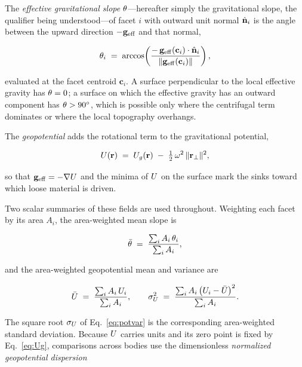 The \emph{effective gravitational slope} $\theta$---hereafter simply the
gravitational slope, the qualifier being understood---of facet $i$ with outward
unit normal $\hat{\mathbf{n}}_{i}$ is the angle between the upward direction $-\mathbf{g}_{\mathrm{eff}}$ and
that normal,

\begin{equation}
\theta_{i} \;=\; \arccos\!\left(
\frac{-\,\mathbf{g}_{\mathrm{eff}}(\mathbf{c}_{i})\cdot\hat{\mathbf{n}}_{i}}
     {\lVert \mathbf{g}_{\mathrm{eff}}(\mathbf{c}_{i}) \rVert} \right),
\label{eq:slope}
\end{equation}

evaluated at the facet centroid $\mathbf{c}_{i}$. A surface perpendicular to
the local effective gravity has $\theta=0$; a surface on which the effective
gravity has an outward component has $\theta>90^{\circ}$, which is possible
only where the centrifugal term dominates or where the local topography
overhangs.

The \emph{geopotential} adds the rotational term to the gravitational
potential,

\begin{equation}
U(\mathbf{r}) \;=\; U_{g}(\mathbf{r})
\;-\;\tfrac{1}{2}\,\omega^{2}\,\lVert\mathbf{r}_{\perp}\rVert^{2},
\label{eq:geopot}
\end{equation}

so that $\mathbf{g}_{\mathrm{eff}}=-\nabla U$ and the minima of $U$ on the surface mark the
sinks toward which loose material is driven.

Two scalar summaries of these fields are used throughout. Weighting each facet
by its area $A_{i}$, the area-weighted mean slope is

\begin{equation}
\bar{\theta} \;=\;
\frac{\sum_{i} A_{i}\,\theta_{i}}{\sum_{i} A_{i}},
\label{eq:slopeavg}
\end{equation}

and the area-weighted geopotential mean and variance are

\begin{equation}
\bar{U} \;=\; \frac{\sum_{i} A_{i}\,U_{i}}{\sum_{i} A_{i}},
\qquad
\sigma_{U}^{2} \;=\;
\frac{\sum_{i} A_{i}\,\bigl(U_{i}-\bar{U}\bigr)^{2}}{\sum_{i} A_{i}}.
\label{eq:potvar}
\end{equation}

The square root $\sigma_{U}$ of Eq.~\eqref{eq:potvar} is the corresponding
area-weighted standard deviation. Because $U$ carries units and its zero
point is fixed by Eq.~\eqref{eq:Ug}, comparisons across bodies use the
dimensionless \emph{normalized geopotential dispersion}

